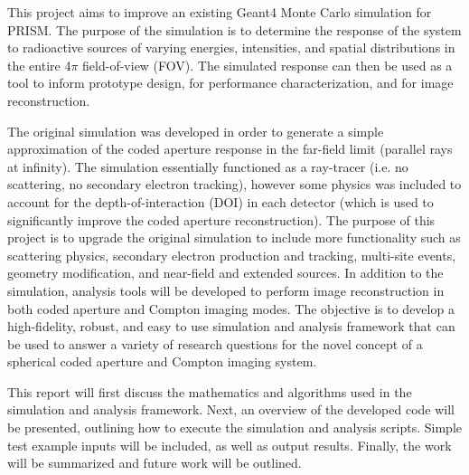 \documentclass[10pt]{article}
\begin{document}


This project aims to improve an existing Geant4 \cite{Agostinelli2003} Monte Carlo simulation for PRISM. The purpose of the simulation is to determine the response of the system to radioactive sources of varying energies, intensities, and spatial distributions in the entire 4$\pi$ field-of-view (FOV). The simulated response can then be used as a tool to inform prototype design, for performance characterization, and for image reconstruction.

The original simulation was developed in order to generate a simple approximation of the coded aperture response in the far-field limit (parallel rays at infinity). The simulation essentially functioned as a ray-tracer (i.e. no scattering, no secondary electron tracking), however some physics was included to account for the depth-of-interaction (DOI) in each detector (which is used to significantly improve the coded aperture reconstruction). The purpose of this project is to upgrade the original simulation to include more functionality such as scattering physics, secondary electron production and tracking, multi-site events, geometry modification, and near-field and extended sources. In addition to the simulation, analysis tools will be developed to perform image reconstruction in both coded aperture and Compton imaging modes. The objective is to develop a high-fidelity, robust, and easy to use simulation and analysis framework that can be used to answer a variety of research questions for the novel concept of a spherical coded aperture and Compton imaging system. 

This report will first discuss the mathematics and algorithms used in the simulation and analysis framework. Next, an overview of the developed code will be presented, outlining how to execute the simulation and analysis scripts. Simple test example inputs will be included, as well as output results. Finally, the work will be summarized and future work will be outlined. 
\end{document}
